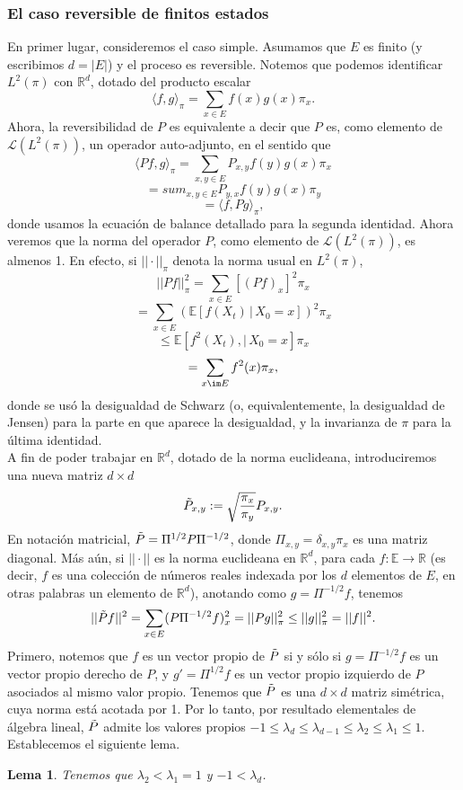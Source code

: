 \documentclass[a4paper]{article}
\newtheorem{lem}{Lema}
\numberwithin{equation}{subsection}
\def\R{\mathbb R}
\def\E{\mathbb E}
\begin{document}
\subsubsection{El caso reversible de finitos estados}
En primer lugar, consideremos el caso simple. Asumamos que $E$ es finito (y escribimos $d=|E|$) y el proceso es reversible. Notemos que podemos identificar $L^2(\pi)$ con $\R^d$, dotado  del producto escalar
\[\langle f,g \rangle_{\pi} = \sum_{x\in E}f(x)g(x)\pi_x.\]
Ahora, la reversibilidad de $P$ es equivalente a decir que $P$ es, como elemento de $\mathcal{L}(L^2(\pi))$, un operador auto-adjunto, en el sentido que
\[\langle Pf,g\rangle_{\pi} = \sum_{x,y\in E}P_{x,y}f(y)g(x)\pi_x\]
\[= sum_{x,y\in E}P_{y,x}f(y)g(x)\pi_y\]
\[= \langle f,Pg \rangle_{\pi},\]
donde usamos la ecuación de balance detallado para la segunda identidad. Ahora veremos que la norma del operador $P$, como elemento de $\mathcal{L}(L^2(\pi))$, es almenos 1. En efecto, si $||\cdot ||_{\pi}$ denota la norma usual en $L^2(\pi)$,
\[||Pf||_{\pi}^2 = \sum_{x\in E}\left[(Pf)_x\right]^2\pi_x\]
\[ = \sum_{x\in E}(\E[f(X_t)\,|\,X_0=x])^2\pi_x\]
\[\leq \E[f^2(X_t),|\,X_0=x]\pi_x\]
\[=\sum_{x\im E}f^2(x)\pi_x,\]
donde se usó la desigualdad de Schwarz (o, equivalentemente, la desigualdad de Jensen) para la parte en que aparece la desigualdad, y la invarianza de $\pi$ para la última identidad.\\
A fin de poder trabajar en $\R^d$, dotado de la norma euclideana, introduciremos una nueva matriz $d\times d$
\[\Tilde{P}_{x,y} := \sqrt{\frac{\pi_x}{\pi_y}}P_{x,y}.\]
En notación matricial, $\Tilde{P}=\Pi^{1/2}P\Pi^{-1/2}$, donde $\Pi_{x,y} = \delta_{x,y}\pi_x$ es una matriz diagonal. Más aún, si $||\cdot ||$ es la norma euclideana en $\R^d$, para cada $f:\E\rightarrow \R$ (es decir, $f$ es una colección de números reales indexada por los $d$ elementos de $E$, en otras palabras un elemento de $\R^d$), anotando como $g = \Pi^{-1/2}f$, tenemos
\[||\Tilde{P}f||^2 = \sum_{x\in E}(P\Pi^{-1/2}f)_x^2 = ||Pg||_{\pi}^2 \leq ||g||_{\pi}^2 = ||f||^2.\]
Primero, notemos que $f$ es un vector propio de $\Tilde{P}$ si y sólo si $g=\Pi^{-1/2}f$ es un vector propio derecho de $P$, y $g' = \Pi^{1/2}f$ es un vector propio izquierdo de $P$ asociados al mismo valor propio. Tenemos que $\Tilde{P}$ es una $d\times d$ matriz simétrica, cuya norma está acotada por 1. Por lo tanto, por resultado elementales de álgebra lineal, $\Tilde{P}$ admite los valores propios $-1\leq \lambda_d \leq \lambda_{d-1}\leq \lambda_2\leq \lambda_1\leq 1$. Establecemos el siguiente lema.
\begin{lem}
Tenemos que $\lambda_2 <\lambda_1 = 1$ y $-1<\lambda_d$.
\end{lem}
\end{document}
